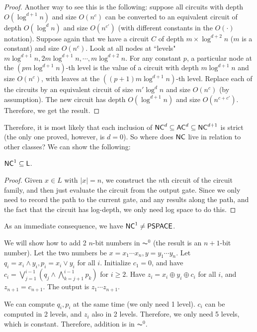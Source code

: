 \begin{proof}
Another way to see this is the following: suppose all circuits with depth $O(\log^{d+1} n)$ and size $O(n^c)$ can be converted to an equivalent circuit of depth $O(\log^{d} n)$ and size $O(n^{c'})$ (with different constants in the $O(\cdot)$ notation). Suppose again that we have a circuit $C$ of depth $m \times \log^{d+2} n$ ($m$ is a constant) and size $O(n^c)$. Look at all nodes at ``levels" $m \log^{d+1} n, 2m \log^{d+1} n, \cdots, m\log^{d+2} n$. For any constant $p$, a particular node at the $(pm\log^{d+1} n)$-th level is the value of a circuit with depth $m\log^{d+1} n$ and size $O(n^c)$, with leaves at the $((p+1)m\log^{d+1} n)$-th level. Replace each of the circuits by an equivalent circuit of size $m'\log^{d} n$ and size $O(n^c)$ (by assumption). The new circuit has depth $O(\log^{d+1} n)$ and size $O(n^{c+c'})$. Therefore, we get the result. 
\end{proof}
Therefore, it is most likely that each inclusion of ${\mathsf{NC}}^d \subseteq {\ensuremath{\mathsf{AC}}}^d \subseteq {\ensuremath{\mathsf{NC}}}^{d+1}$ is strict (the only one proved, however, is $d = 0$).  So where does ${\mathsf{NC}}$ live in relation to other classes? We can show the following:
\begin{theorem}
${\mathsf{NC}}^1 \subseteq {\ensuremath{\mathsf{L}}}$.
\end{theorem}

\begin{proof}
Given $x \in L$ with $|x| = n$, we construct the $n$th circuit of the circuit family, and then just evaluate the circuit from the output gate. Since we only need to record the path to the current gate, and any results along the path, and the fact that the circuit has log-depth, we only need log space to do this.
\end{proof}
As an immediate consequence, we have ${\mathsf{NC}}^1 \ne {\ensuremath{\mathsf{PSPACE}}}$. 

\begin{example}
We will show how to add 2 $n$-bit numbers in $\AC^0$ (the result is an $n+1$-bit number). Let the two numbers be $x = x_1\cdots x_n, y = y_1\cdots y_n$. Let $q_i = x_i \wedge y_i, p_i = x_i \vee y_i$ for all $i$. Initialize $c_1 = 0$, and have $c_i = \bigvee_{j=1}^{i-1} (q_j \wedge \bigwedge_{k=j+1}^{i-1}p_k)$ for $i \ge 2$. Have $z_i = x_i \oplus y_i \oplus c_i$ for all $i$, and $z_{n+1} = c_{n+1}$. The output is $z_1\cdots z_{n+1}$. 

\par We can compute $q_i, p_i$ at the same time (we only need 1 level). $c_i$ can be computed in 2 levels, and $z_i$ also in 2 levels. Therefore, we only need 5 levels, which is constant. Therefore, addition is in $\AC^0$. 
\end{example}

